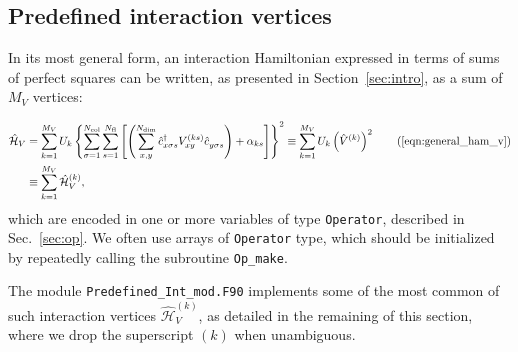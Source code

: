 %
\subsection{Predefined interaction vertices} \label{sec:interaction_vertices}

In its most general form, an interaction Hamiltonian expressed in terms of sums of perfect squares can be written, as presented in Section~\ref{sec:intro}, as a sum of $M_V$ vertices: %

\begin{align*}
\hat{\mathcal{H}}_{V} &=  \sum\limits_{k=1}^{M_V}U_{k}
\left\{ \sum\limits_{\sigma=1}^{N_{\mathrm{col}}}
\sum\limits_{s=1}^{N_{\mathrm{fl}}} \left[ \left(
\sum\limits_{x,y}^{N_{\mathrm{dim}}} \hat{c}^{\dagger}_{x \sigma s}V_{xy}^{(k s)}\hat{c}^{\phantom\dagger}_{y \sigma s}\right)  +\alpha_{k s}  \right] \right\}^{2}
\equiv    \sum\limits_{k=1}^{M_V}U_{k}   \left(\hat{V}^{(k)} \right)^2 \tag{\ref{eqn:general_ham_v}}\\
&\equiv    \sum\limits_{k=1}^{M_V}\hat{\mathcal{H}}_V^{(k)},
\end{align*}
which are encoded in one or more variables of type \texttt{Operator}, described in Sec.~\ref{sec:op}. We often use arrays of \texttt{Operator} type, which should be initialized by repeatedly calling the subroutine \texttt{Op\_make}.

The module \texttt{Predefined\_Int\_mod.F90} implements some of the most common of such interaction vertices $\hat{\mathcal{H}}_V^{(k)}$, as detailed in the remaining of this section, where we drop the superscript $(k)$ when unambiguous.



